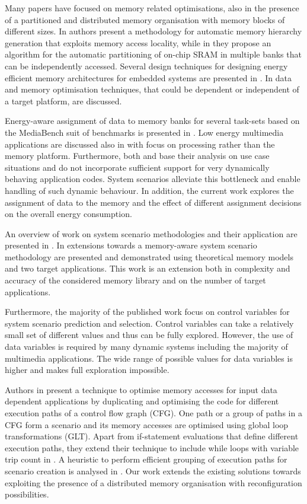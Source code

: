 \documentclass[a4paper,conference]{IEEEtran}
\begin{document}
Many papers have focused on memory related optimisations, also in the presence of a partitioned and distributed memory organisation with memory blocks of different sizes. In \cite{Ben00b} authors present a methodology for automatic memory hierarchy generation that exploits memory access locality, while in \cite{Ben00c} they propose an algorithm for the automatic partitioning of on-chip SRAM in multiple banks that can be independently accessed. Several design techniques for designing energy efficient memory architectures for embedded systems are presented in \cite{Mac02}. In \cite{Pgk01} data and memory optimisation techniques, that could be dependent or independent of a target platform, are discussed. 

Energy-aware assignment of data to memory banks for several task-sets based on the MediaBench suit of benchmarks is presented in \cite{Mar03}. Low energy multimedia applications are discussed also in \cite{Chu02} with focus on processing rather than the memory platform. Furthermore, both \cite{Mar03} and \cite{Chu02} base their analysis on use case situations and do not incorporate sufficient support for very dynamically behaving application codes. System scenarios alleviate this bottleneck and enable handling of such dynamic behaviour. In addition, the current work explores the assignment of data to the memory and the effect of different assignment decisions on the overall energy consumption.

An overview of work on system scenario methodologies and their application are presented in \cite{Gheorghita2007}. In \cite{Fil12} extensions towards a memory-aware system scenario methodology are presented and demonstrated using theoretical memory models and two target applications. This work is an extension both in complexity and accuracy of the considered memory library and on the number of target applications. 

Furthermore, the majority of the published work focus on control variables for system scenario prediction and selection. Control variables can take a relatively small set of different values and thus can be fully explored. However, the use of data variables \cite{Elena2010} is required by many dynamic systems including the majority of multimedia applications. The wide range of possible values for data variables is higher and makes full exploration impossible. 

Authors in \cite{Pal06} present a technique to optimise memory accesses for input data dependent applications by duplicating and optimising the code for different execution paths of a control flow graph (CFG). One path or a group of paths in a CFG form a scenario and its memory accesses are optimised using global loop transformations (GLT). Apart from if-statement evaluations that define different execution paths, they extend their technique to include while loops with variable trip count in \cite{Pal06b}. A heuristic to perform efficient grouping of execution paths for scenario creation is analysed in \cite{Pal07}. Our work extends the existing solutions towards exploiting the presence of a distributed memory organisation with reconfiguration possibilities.
\end{document}
